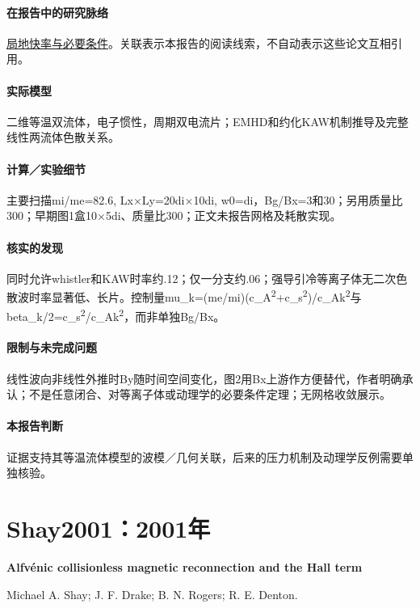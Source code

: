 \documentclass[UTF8,a4paper,11pt,openany,fontset=fandol]{ctexbook}
\begin{document}
\paragraph{在报告中的研究脉络}\hyperref[story:fast]{局地快率与必要条件}。关联表示本报告的阅读线索，不自动表示这些论文互相引用。

\paragraph{实际模型}二维等温双流体，电子惯性，周期双电流片；EMHD和约化KAW机制推导及完整线性两流体色散关系。

\paragraph{计算／实验细节}主要扫描mi/me=82.6, Lx×Ly=20di×10di, w0=di，Bg/Bx=3和30；另用质量比300；早期图1盒10×5di、质量比300；正文未报告网格及耗散实现。

\paragraph{核实的发现}同时允许whistler和KAW时率约.12；仅一分支约.06；强导引冷等离子体无二次色散波时率显著低、长片。控制量mu\_k=(me/mi)(c\_A\textsuperscript{2}+c\_s\textsuperscript{2})/c\_Ak\textsuperscript{2}与beta\_k/2=c\_s\textsuperscript{2}/c\_Ak\textsuperscript{2}，而非单独Bg/Bx。

\paragraph{限制与未完成问题}线性波向非线性外推时By随时间空间变化，图2用Bx上游作方便替代，作者明确承认；不是任意闭合、对等离子体或动理学的必要条件定理；无网格收敛展示。

\paragraph{本报告判断}证据支持其等温流体模型的波模／几何关联，后来的压力机制及动理学反例需要单独核验。

\section{Shay2001：2001年}\label{paper:Shay2001}

\textbf{Alfvénic collisionless magnetic reconnection and the Hall term}\citep{Shay2001}\

Michael A. Shay;  J. F. Drake;  B. N. Rogers;  R. E. Denton.
\end{document}
